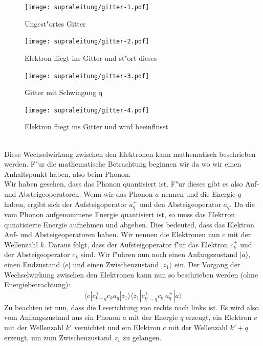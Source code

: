 \begin{refsection}
\begin{figure}
\centering
\texttt{[image: supraleitung/gitter-1.pdf]} %
\caption{Ungest"ortes Gitter
\label{supraleitung:Gitter1}}
\end{figure}
\begin{figure}
\centering
\texttt{[image: supraleitung/gitter-2.pdf]} %
\caption{Elektron fliegt ins Gitter und st"ort dieses
\label{supraleitung:Gitter2}}
\end{figure}
\begin{figure}
\centering
\texttt{[image: supraleitung/gitter-3.pdf]} %
\caption{Gitter mit Schwingung q
\label{supraleitung:Gitter3}}
\end{figure}
\begin{figure}
\centering
\texttt{[image: supraleitung/gitter-4.pdf]} %
\caption{Elektron fliegt ins Gitter und wird beeinflusst
\label{supraleitung:Gitter4}}
\end{figure}
\\
Diese Wechselwirkung zwischen den Elektronen kann mathematisch beschrieben werden. F"ur die mathematische Betrachtung beginnen wir da wo wir einen Anhaltspunkt haben, also beim Phonon.
\\
Wir haben gesehen, dass das Phonon quantisiert ist. F"ur dieses gibt es also Auf- und Absteigeoperatoren. Wenn wir das Phonon $a$ nennen und die Energie $q$ haben, ergibt sich der Aufsteigoperator $a^+_q$ und den Absteigeoperator $a_q$. Da die vom Phonon aufgenommene Energie quantisiert ist, so muss das Elektron qunatisierte Energie aufnehmen und abgeben. Dies bedeuted, dass das Elektron Auf- und Absteigeoperatoren haben. Wir nennen die Elektronen nun $c$ mit der Wellenzahl $k$. Daraus folgt, dass der Aufsteigoperator f"ur das Elektron $c^+_k$ und der Absteigeoperator $c_k$ sind.
Wir f"uhren nun noch einen Anfangszustand $|a\rangle$, einen Endzustand $\langle e|$ und einen Zwischenzustand $|z_1\rangle$ ein. Der Vorgang der Wechselwirkung zwischen den Elektronen kann nun so beschrieben werden (ohne Energiebetrachtung):
\begin{equation}
\langle e|c^+_{k+q} c_k a_q |z_1\rangle\langle z_1| c^+_{k'-q} c_{k'} a^+_q |a\rangle
\label{supraleitung:WechelwirkungOE}
\end{equation}
Zu beachten ist nun, dass die Leserichtung von rechts nach links ist. Es wird also vom Anfangszustand aus ein Phonon $a$ mit der Energie $q$ erzeugt, ein Elektron $c$ mit der Wellenzahl $k'$ vernichtet und ein Elektron $c$ mit der Wellenzahl $k'+q$ erzeugt, um zum Zwischenzustand $z_1$ zu gelangen.

\end{refsection}
